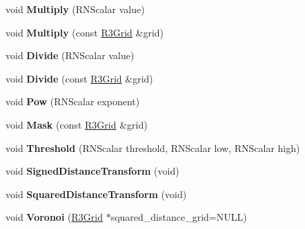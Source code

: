 \begin{DoxyCompactItemize}
\item 
void {\bfseries Multiply} (R\+N\+Scalar value)\hypertarget{class_r3_grid_a17cbcc2010c459c676f57431f5fd4926}{}\label{class_r3_grid_a17cbcc2010c459c676f57431f5fd4926}

\item 
void {\bfseries Multiply} (const \hyperlink{class_r3_grid}{R3\+Grid} \&grid)\hypertarget{class_r3_grid_a0551d01268fb98d7ef285c71f7dd6366}{}\label{class_r3_grid_a0551d01268fb98d7ef285c71f7dd6366}

\item 
void {\bfseries Divide} (R\+N\+Scalar value)\hypertarget{class_r3_grid_aa667c0b95037da317574afe473516eba}{}\label{class_r3_grid_aa667c0b95037da317574afe473516eba}

\item 
void {\bfseries Divide} (const \hyperlink{class_r3_grid}{R3\+Grid} \&grid)\hypertarget{class_r3_grid_a498e21a749229027ea781404a026d1f4}{}\label{class_r3_grid_a498e21a749229027ea781404a026d1f4}

\item 
void {\bfseries Pow} (R\+N\+Scalar exponent)\hypertarget{class_r3_grid_a4920beffa01692f1d4c2c97d1bfc44d4}{}\label{class_r3_grid_a4920beffa01692f1d4c2c97d1bfc44d4}

\item 
void {\bfseries Mask} (const \hyperlink{class_r3_grid}{R3\+Grid} \&grid)\hypertarget{class_r3_grid_a15befdb60b898045b36d00c2c4057355}{}\label{class_r3_grid_a15befdb60b898045b36d00c2c4057355}

\item 
void {\bfseries Threshold} (R\+N\+Scalar threshold, R\+N\+Scalar low, R\+N\+Scalar high)\hypertarget{class_r3_grid_aadc7fd47c3efc3eb0f4183475c53258a}{}\label{class_r3_grid_aadc7fd47c3efc3eb0f4183475c53258a}

\item 
void {\bfseries Signed\+Distance\+Transform} (void)\hypertarget{class_r3_grid_ad11edc63b98ee9e456d77edf39227a08}{}\label{class_r3_grid_ad11edc63b98ee9e456d77edf39227a08}

\item 
void {\bfseries Squared\+Distance\+Transform} (void)\hypertarget{class_r3_grid_af52aaf1a7d2dbabb5d5c2fccaa9a2847}{}\label{class_r3_grid_af52aaf1a7d2dbabb5d5c2fccaa9a2847}

\item 
void {\bfseries Voronoi} (\hyperlink{class_r3_grid}{R3\+Grid} $\ast$squared\+\_\+distance\+\_\+grid=N\+U\+LL)\hypertarget{class_r3_grid_acbac4ab75e1778977192dd31f63c8a55}{}\label{class_r3_grid_acbac4ab75e1778977192dd31f63c8a55}


\end{DoxyCompactItemize}

